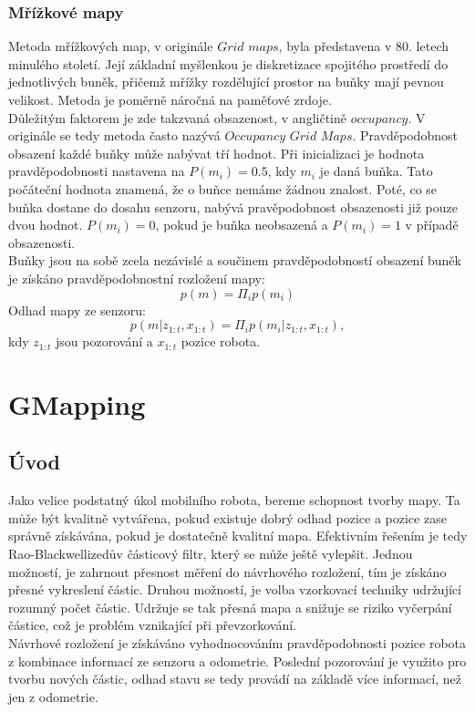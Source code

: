 \documentclass[12pt]{article}
\begin{document}
\subsubsection{Mřížkové mapy}
Metoda mřížkových map, v originále $Grid$ $maps$, byla představena v 80. letech minulého století. Její základní myšlenkou je diskretizace spojitého prostředí do jednotlivých buněk, přičemž mřížky rozdělující prostor na buňky mají pevnou velikost. Metoda je poměrně náročná na paměťové zrdoje.\\
\indent Důležitým faktorem je zde takzvaná obsazenost, v angličtině $occupancy$. V originále se tedy metoda často nazývá $Occupancy$ $Grid$ $Maps$. Pravděpodobnost obsazení každé buňky může nabývat tří hodnot. Při inicializaci je hodnota pravděpodobnosti nastavena na $P(m_i)=0.5$, kdy $m_i$ je daná buňka. Tato počáteční hodnota znamená, že o buňce nemáme žádnou znalost. Poté, co se buňka dostane do dosahu senzoru, nabývá pravěpodobnost obsazenosti již pouze dvou hodnot. $P(m_i)=0$, pokud je buňka neobsazená a $P(m_i)=1$ v případě obsazenosti.\\
\indent Buňky jsou na sobě zcela nezávislé a součinem pravděpodobností obsazení buněk je získáno pravděpodobnostní rozložení mapy:
\begin{equation}
	p(m)=\Pi_ip(m_i)
\end{equation}
Odhad mapy ze senzoru:
\begin{equation}
	p(m|z_{1:t},x_{1:t})=\Pi_ip(m_i|z_{1:t},x_{1:t}),
\end{equation}
kdy $z_{1:t}$ jsou pozorování a $x_{1:t}$ pozice robota.
\newpage

\section{GMapping}

\subsection{Úvod}
Jako velice podstatný úkol mobilního robota, bereme schopnost tvorby mapy. Ta může být kvalitně vytvářena, pokud existuje dobrý odhad pozice a pozice zase správně získávána, pokud je dostatečně kvalitní mapa. Efektivním řešením je tedy Rao-Blackwellizedův částicový filtr, který se může ještě vylepšit. Jednou možností, je zahrnout přesnost měření do návrhového rozložení, tím je získáno přesné vykreslení částic. Druhou možností, je volba vzorkovací techniky udržující rozumný počet částic. Udržuje se tak přesná mapa a snižuje se riziko vyčerpání částice, což je problém vznikající při převzorkování.\\
\indent Návrhové rozložení je získáváno vyhodnocováním pravděpodobnosti pozice robota z kombinace informací ze senzoru a odometrie. Poslední pozorování je využito pro tvorbu nových částic, odhad stavu se tedy provádí na základě více informací, než jen z odometrie. 
\end{document}
